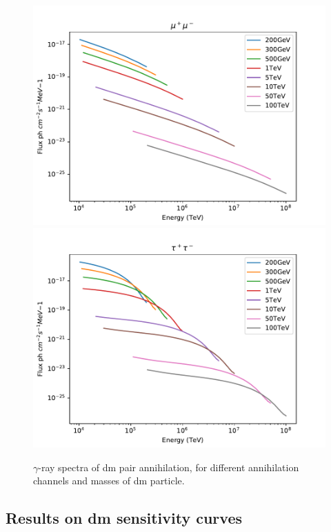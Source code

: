 \documentclass[main.tex]{subfiles}
\begin{document}
\begin{figure}[h]
  \endminipage \\
  \includegraphics[width=1\textwidth]{Pictures/specMu.pdf}
  \endminipage
  \includegraphics[width=1\textwidth]{Pictures/specTau.pdf}
  \endminipage \\
  \caption{$\gamma$-ray spectra of \gls{dm} pair annihilation, for different annihilation channels and masses of \gls{dm} particle. }
  \label{fig:dmspec}
\end{figure}

\subsection{Results on \gls{dm} sensitivity curves}
\end{document}
